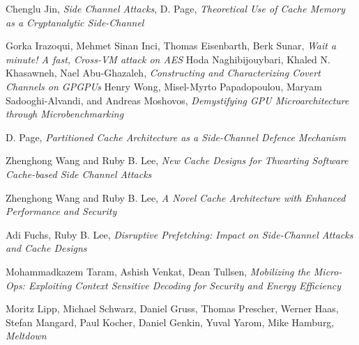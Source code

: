 \documentclass[twoside]{iitbreport}
\begin{document}



%
\begin{thebibliography}{99}
Chenglu Jin, {\it Side Channel Attacks},
D. Page, {\it Theoretical Use of Cache Memory as a Cryptanalytic Side-Channel}

Gorka Irazoqui, Mehmet Sinan Inci, Thomas Eisenbarth, Berk Sunar,  {\it Wait a minute! A fast, Cross-VM attack on AES}
Hoda Naghibijouybari,
Khaled N. Khasawneh,
Nael Abu-Ghazaleh,
{\it Constructing and Characterizing Covert Channels on GPGPUs}
Henry Wong, Misel-Myrto Papadopoulou, Maryam Sadooghi-Alvandi, and Andreas Moshovos, {\it Demystifying GPU Microarchitecture through Microbenchmarking}

D. Page, {\it Partitioned Cache Architecture as a Side-Channel Defence Mechanism}

Zhenghong Wang and Ruby B. Lee, {\it New Cache Designs for Thwarting Software Cache-based Side Channel Attacks}

Zhenghong Wang and Ruby B. Lee, {\it A Novel Cache Architecture with Enhanced Performance and Security}

Adi Fuchs, Ruby B. Lee, {\it Disruptive Prefetching: Impact on Side-Channel Attacks and Cache Designs}

Mohammadkazem Taram, Ashish Venkat, Dean Tullsen, {\it Mobilizing the Micro-Ops: Exploiting Context Sensitive Decoding for Security and Energy Efficiency}

Moritz Lipp, Michael Schwarz, Daniel Gruss, Thomas Prescher, Werner Haas,
Stefan Mangard, Paul Kocher, Daniel Genkin, Yuval Yarom, Mike Hamburg, {\it Meltdown}


\end{thebibliography}
\end{document}
